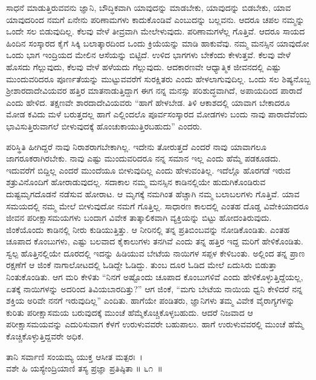ಸಾಧನೆ ಮಾಡುತ್ತಿರುವವನು ಜ್ಞಾನಿ, ಬೌದ್ಧಿಕವಾಗಿ ಯಾವುದನ್ನು ಮಾಡಬೇಕು, ಯಾವುದನ್ನು ಬಿಡಬೇಕು, ಯಾವ ಯಾವುದರಿಂದ ನಮಗೆ ಏನೇನು ಪರಿಣಾಮಗಳು ಕಾದುಕೊಂಡಿವೆ ಎಂಬುದನ್ನು ಬಲ್ಲವನು. ಆದರೂ ಚಪಲ ನಮ್ಮನ್ನು ಒಂದೇ ಸಲ ಬಿಡುವುದಿಲ್ಲ. ಕೆಲವು ವೇಳೆ ತೀವ್ರವಾಗಿ ಮೇಲೇಳುವುದು. ಪರಿಣಾಮಗಳೆಲ್ಲ ಗೊತ್ತಿವೆ. ಆದರೂ ಸಾಯದ ಹಿಂದಿನ ಸಂಸ್ಕಾರದ ಕೈಗೆ ಸಿಕ್ಕಿ ಬಲಾತ್ಕಾರದಿಂದ ಒಂದು ಕ್ರಿಯೆಯನ್ನು ಮಾಡಿ ಹಾಕುವೆವು. ನಮ್ಮ ಮನಸ್ಸಿನ ಯಾವುದೋ ಒಂದು ಭಾಗ ಇಂದ್ರಿಯದ ಮೇಲಿನ ಆಸೆಯನ್ನು ಬಿಟ್ಟಿದೆ. ಉಳಿದ ಭಾಗಗಳು ಬೇಕೆಂದು ಕೇಳುತ್ತವೆ. ಕೆಲವು ವೇಳೆ ಹೊಸದು ಗೆಲ್ಲುವುದು, ಕೆಲವು ವೇಳೆ ಹಳೆಯದು ಗೆಲ್ಲುವುದು. ಆದಕಾರಣವೇ ಆಧ್ಯಾತ್ಮಿಕ ಜೀವನದಲ್ಲಿ ಎಷ್ಟು ಮುಂದುವರಿದರೂ ಪೂರ್ಣತೆಯನ್ನು ಮುಟ್ಟುವವರೆಗೆ ಸುರಕ್ಷಿತರು ಎಂದು ಹೇಳಲಾಗುವುದಿಲ್ಲ. ಒಂದು ಸಲ ಶಿಷ್ಯನೊಬ್ಬ ಶ‍್ರೀಶಾರದಾದೇವಿಯವರ ಹತ್ತಿರ ಮಾತನಾಡುತ್ತಿದ್ದಾಗ ಈಗ ನನ್ನ ಮನಸ್ಸು ಪರಿಶುದ್ಧವಾಗಿದೆ, ಅಪಾಯದಿಂದ ಪಾರಾದೆ ಎಂದು ಹೇಳಿದ. ತಕ್ಷಣವೇ ಶಾರದಾದೇವಿಯವರು “ಹಾಗೆ ಹೇಳಬೇಡ. ತಿಳಿ ಆಕಾಶದಲ್ಲಿ ಯಾವಾಗ ಬೇಕಾದರೂ ಮೋಡ ಕವಿದು ಮಳೆ ಬರುತ್ತದಲ್ಲ ಹಾಗೆ ಎಲ್ಲಿಂದಲೊ ಪೂರ್ವಸಂಸ್ಕಾರದ ಮೋಡಗಳು ಬಂದು ನಾವು ಪಾರಾದೆವೆಂದು ಭಾವಿಸುತ್ತಿರುವಾಗಲೆ ಬೀಳುವುದಕ್ಕೆ ಹೊಂಚುಕಾಯುತ್ತಿರಬಹುದು” ಎಂದರು.

ಪರಿಸ್ಥಿತಿ ಹೀಗಿದ್ದರೆ ನಾವು ನಿರಾಶರಾಗಬೇಕಾಗಿಲ್ಲ. ಇದೇನು ತೋರುತ್ತದೆ ಎಂದರೆ ನಾವು ಯಾವಾಗಲೂ ಜಾಗರೂಕರಾಗಿರಬೇಕು. ನಾವು ಎಷ್ಟು ಮುಂದುವರಿದರೂ ನನ್ನ ಸಮಾನ ಇಲ್ಲ ಎಂದು ಹೆಮ್ಮೆ ಪಡಕೂಡದು. ಇದುವರೆಗೆ ಬಿದ್ದಿಲ್ಲ ಎಂದರೆ ಮುಂದೆಯೂ ಬೀಳುವುದಿಲ್ಲ ಎಂದು ಹೇಳುವಂತಿಲ್ಲ. ಇದೆಲ್ಲೊ ಹೊರಗಡೆ ಇರುವ ಶತ್ರುವಿನೊಂದಿಗೆ ಹೋರಾಡುವುದಲ್ಲ. ಸದಾಕಾಲ ನಮ್ಮ ಮನಸ್ಸಿನ ಕಾಡಿನಲ್ಲಿಯೇ ಹುದುಗಿಕೊಂಡಿರುವ ದುಷ್ಟಮೃಗದೊಡನೆ ನಡೆಸುವ ಹೋರಾಟ. ಆ ಮೃಗಕ್ಕೆ ನಮಗಿಂತ ಹೆಚ್ಚಾಗಿ ನಮ್ಮ ಬಲಾಬಲಗಳು ಗೊತ್ತಿವೆ. ಯಾವ ಸಮಯದಲ್ಲಿ ನಮ್ಮ ಮೇಲೆ ಬೀಳುವುದೋ ನಮಗೆ ಗೊತ್ತಿಲ್ಲ. ಸಾಧಾರಣ ಕಾಲದಲ್ಲಿ ಎಂತಹ ದೊಡ್ಡ ವಿವೇಕಿಯಾದರೂ ಜೀವನ ಪರೀಕ್ಷಾಸಮಯಗಳು ಬಂದಾಗ ವಿವೇಕ ತಾತ್ಕಾಲಿಕವಾಗಿ ವ್ಯಕ್ತಿಯನ್ನು ಬಿಟ್ಟು ಹೋದಂತಿರುವುದು. ಜಿಂಕೆಯೊಂದು ಕಾಡಿನಲ್ಲಿ ನೀರು ಕುಡಿಯುತ್ತಿತ್ತು. ಆ ನೀರಿನಲ್ಲಿ ತನ್ನ ಪ್ರತಿಬಿಂಬವನ್ನು ನೋಡಿಕೊಂಡಿತು. ಎಂತಹ ಚೂಪಾದ ಕೊಂಬುಗಳು, ಎಷ್ಟು ಬಲವಾದ ಕೈಕಾಲುಗಳು ತನಗಿವೆ ಎಂದು ತನ್ನ ಹತ್ತಿರ ಇದ್ದ ಮರಿಗೆ ಹೇಳಿಕೊಂಡಿತು. ಸ್ವಲ್ಪ ಹೊತ್ತಿನಲ್ಲಿಯೇ ದೂರದಲ್ಲಿ ಇದನ್ನು ಹಿಡಿಯುವ ಬೇಟೆಯ ನಾಯಿಗಳ ಸಪ್ಪಳ ಕೇಳಿಬಂತು. ಅಲ್ಲಿಂದ ತನ್ನ ಪ್ರಾಣ ರಕ್ಷಣೆಗೆ ಆ ಜಿಂಕೆ ನಾಗಾಲೋಟದಲ್ಲಿ ಓಡಿದ್ದೇ ಓಡಿದ್ದು. ತುಂಬ ದೂರ ಓಡಿದ ಮೇಲೆ ಏದುಸಿರು ಬಿಡುತ್ತಾ ನಿಂತುಕೊಂಡಿತು. ಆಗ ಮರಿ ಕೇಳಿತು “ನಿನಗೆ ಅಷ್ಟೊಂದು ಚೂಪಾದ ಕೊಂಬುಗಳಿವೆ ಎಂದು ಹೇಳಿಕೊಳ್ಳುತ್ತಿದ್ದೆಯಲ್ಲ, ಏತಕ್ಕೆ ನಾಯಿಗಳನ್ನು ಅದರಿಂದ ತಿವಿಯಬಾರದಿತ್ತು?” ಆಗ ಜಿಂಕೆ, “ಮಗು ಬೇಟೆಯ ನಾಯಿಯ ಧ್ವನಿ ಕೇಳಿದರೆ ನನ್ನ ಶಕ್ತಿಯ ಅರಿವೇ ನನಗೆ ಇರುವುದಿಲ್ಲ” ಎಂದಿತು. ಹಾಗೆಯೇ ಪಂಡಿತರು, ಜ್ಞಾನಿಗಳು ತಮ್ಮ ವಿವೇಕ ವೈರಾಗ್ಯಗಳನ್ನು ಕುರಿತು ಪರೀಕ್ಷಾಸಮಯ ಬರುವುದಕ್ಕೆ ಮುಂಚೆ ಹೆಮ್ಮೆಕೊಚ್ಚಿಕೊಳ್ಳಬಹುದು. ಆದರೆ ನಿಜವಾದ ಆ ಪರೀಕ್ಷಾಸಮಯವನ್ನು ಎದುರಿಸುವಾಗ ಕೆಳಗೆ ಉರುಳುವವರೇ ಬಹುಪಾಲು. ಹಾಗೆ ಉರುಳುವವರಲ್ಲಿ ಮುಂಚೆ ಹೆಮ್ಮೆ ಕೊಚ್ಚಿಕೊಳ್ಳುತ್ತಿದ್ದವರೇ ಅಧಿಕ.

\begin{shloka}
ತಾನಿ ಸರ್ವಾಣಿ ಸಂಯಮ್ಯ ಯುಕ್ತ ಆಸೀತ ಮತ್ಪರಃ~।\\ವಶೇ ಹಿ ಯಸ್ಯೇಂದ್ರಿಯಾಣಿ ತಸ್ಯ ಪ್ರಜ್ಞಾ ಪ್ರತಿಷ್ಠಿತಾ \hfill॥ ೬೧~॥
\end{shloka}

